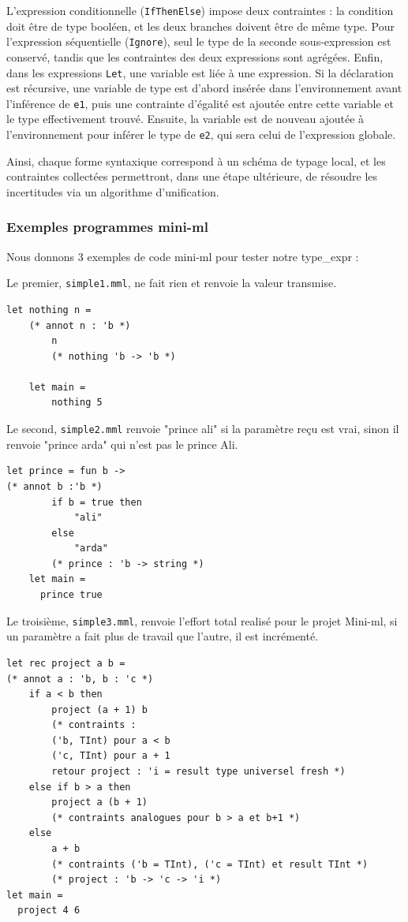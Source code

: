 L'expression conditionnelle (\texttt{IfThenElse}) impose deux contraintes : la condition doit être de type booléen, et les deux branches doivent être de même type.
Pour l'expression séquentielle (\texttt{Ignore}), seul le type de la seconde sous-expression est conservé, tandis que les contraintes des deux expressions sont agrégées.
Enfin, dans les expressions \texttt{Let}, une variable est liée à une expression. Si la déclaration est récursive, une variable de type est d'abord insérée dans l'environnement avant l'inférence de \texttt{e1}, puis une contrainte d'égalité est ajoutée entre cette variable et le type effectivement trouvé.
Ensuite, la variable est de nouveau ajoutée à l'environnement pour inférer le type de \texttt{e2}, qui sera celui de l'expression globale.

Ainsi, chaque forme syntaxique correspond à un schéma de typage local, et les contraintes collectées permettront, dans une étape ultérieure, de résoudre les incertitudes via un algorithme d'unification.

\subsubsection{Exemples programmes mini-ml}
Nous donnons 3 exemples de code mini-ml pour tester notre type\_expr :

Le premier, \texttt{simple1.mml}, ne fait rien et renvoie la valeur transmise.

\begin{lstlisting}
let nothing n =
    (* annot n : 'b *)
        n
        (* nothing 'b -> 'b *)
    
    let main =
        nothing 5
    \end{lstlisting}

Le second, \texttt{simple2.mml} renvoie "prince ali" si la paramètre reçu est vrai, sinon il renvoie "prince arda" qui n'est pas le prince Ali.

\begin{lstlisting}
let prince = fun b ->
(* annot b :'b *)
        if b = true then
            "ali"
        else
            "arda"
        (* prince : 'b -> string *)
    let main =
      prince true
        \end{lstlisting}

Le troisième, \texttt{simple3.mml}, renvoie l'effort total realisé pour le projet Mini-ml, si un paramètre a fait plus de travail que l'autre, il est incrémenté.

\begin{lstlisting}
let rec project a b =
(* annot a : 'b, b : 'c *)
    if a < b then
        project (a + 1) b
        (* contraints :
        ('b, TInt) pour a < b
        ('c, TInt) pour a + 1
        retour project : 'i = result type universel fresh *)
    else if b > a then
        project a (b + 1)
        (* contraints analogues pour b > a et b+1 *)
    else
        a + b
        (* contraints ('b = TInt), ('c = TInt) et result TInt *)
        (* project : 'b -> 'c -> 'i *)
let main =
  project 4 6
            \end{lstlisting}

